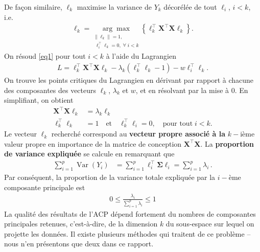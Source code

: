 De façon similaire, $\ell_k$ maximise la variance de $Y_k$ d\'ecor\'el\'ee de tout $\ell_i$, $i<k$, i.e. 
\begin{align}
\mathbf{\ell}_k=\underset{\substack{\|\ell_k\|=1,\\ \;\ell_{i}^{\!\top}\ell_k=0,\;\forall\;i<k}}{\arg \max} \left\{\ell^{\!\top}_k\mathbf{X}^{\!\top} \mathbf{X} \ell_k\right\}.\label{eq1}
\end{align}
On résoud \eqref{eq1} pour tout  $i<k$ \`a l'aide du  Lagrangien
\begin{align*}
L=\ell^{\!\top}_k\mathbf{X}^{\!\top} \mathbf{X} \ell_k-\lambda_k(\ell^{\!\top}_k\ell_k-1)-w\ell_{i}^{\!\top}\ell_k.
\end{align*}
On trouve les points critiques du Lagrangien en dérivant par rapport à chacune des composantes des vecteurs $\ell_k$, $\lambda_k$ et $w$, et en r\'esolvant par la mise \`a 0. En simplifiant, on obtient 
\begin{align*}
\mathbf{X}^{\!\top} \mathbf{X} \ell_k&=\lambda_k\ell_k\\
\ell^{\!\top}_k\ell_k&=1 \quad\text{et}\quad\ell^{\!\top}_k\ell_i=0,\quad\text{pour tout}\; i<k.
\end{align*}
Le vecteur $\ell_k$ recherché correspond au \textbf{vecteur propre associé à la} $k-$ième valeur propre en importance de la matrice de conception $\mathbf{X}^{\!\top} \mathbf{X}$. \newl
La \textbf{proportion de variance expliquée} se calcule en remarquant que
\begin{align*}
\sum_{i=1}^{p}\operatorname{Var}\left(Y_{i}\right) &=\sum_{i=1}^{p}\ell_{i}^{\!\top} \boldsymbol{\Sigma} \ell_{i}=\sum_{i=1}^{p}\lambda_i \,.
\end{align*}
Par conséquent, la proportion de la variance totale expliquée par la $i-$ème composante principale est 
\begin{align*}
0\leq \frac{\lambda_i}{\sum_{i=1}^{p}\lambda_i }\leq 1
\end{align*}
La qualité des résultats de l'ACP dépend fortement du nombres de composantes principales retenues, c'est-\`a-dire, de la dimension $k$ du sous-espace sur lequel on projette les donn\'ees. Il existe plusieurs méthodes qui traitent de ce problème -- nous n'en présentons que deux dans ce rapport.
